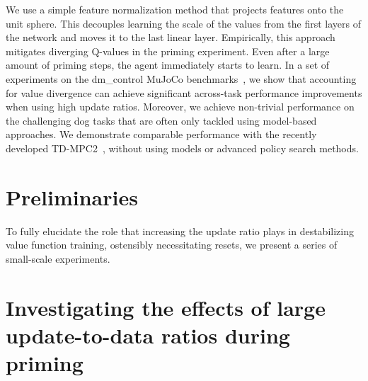 We use a simple feature normalization method \parencite{zhang2019root, wang2020striving, bjorck2022is} that projects features onto the unit sphere.
This decouples learning the scale of the values from the first layers of the network and moves it to the last linear layer.
Empirically, this approach mitigates diverging Q-values in the priming experiment. 
Even after a large amount of priming steps, the agent immediately starts to learn. %
In a set of experiments on the \textsf{dm\_control} MuJoCo benchmarks~\parencite{tunyasuvunakool2020dmcontrol}, we show that accounting for value divergence can achieve significant across-task performance improvements when using high update ratios. 
Moreover, we achieve non-trivial performance on the challenging dog tasks that are often only tackled using model-based approaches. We demonstrate comparable performance with the recently developed TD-MPC2~\parencite{hansen2024tdmpc}, without using models or advanced policy search methods.


\section{Preliminaries} \label{sec:overestimation:preliminaries}

To fully elucidate the role that increasing the update ratio plays in destabilizing value function training, ostensibly necessitating resets, we present a series of small-scale experiments.

\section{Investigating the effects of large update-to-data ratios during priming} \label{sec:overestimation:investigating}

